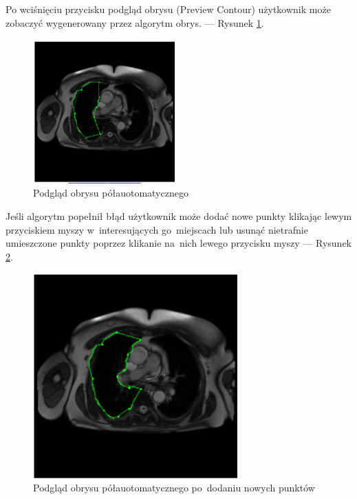 \documentclass[a4paper,11pt,twoside,openright]{report}
\theoremstyle{definition}
\begin{document}
\begin{enumerate}
Po wciśnięciu przycisku podgląd obrysu (Preview Contour) użytkownik może
zobaczyć wygenerowany przez algorytm obrys. --- Rysunek \ref{fig:12}.

\begin{figure}[h!]
	\center
	\includegraphics[width=0.5\textwidth]{12}
	\caption{Podgląd obrysu półauotomatycznego}
    	\label{fig:12}
\end{figure}

\pagebreak

Jeśli algorytm popełnił błąd użytkownik może dodać nowe punkty klikając lewym
przyciskiem myszy w~interesujących go~miejscach lub usunąć nietrafnie umieszczone
punkty poprzez klikanie na~nich lewego przycisku myszy --- Rysunek \ref{fig:13}.

\begin{figure}[h!]
	\center
	\includegraphics[width=0.7\textwidth]{13}
	\caption{Podgląd obrysu półauotomatycznego po~dodaniu nowych punktów}
    	\label{fig:13}
\end{figure}


\end{enumerate}
\end{document}

